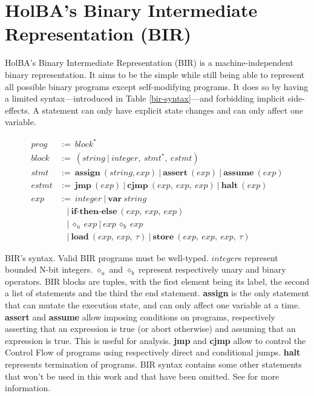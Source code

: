 \documentclass{kththesis}
\begin{document}
{\section{HolBA's Binary Intermediate Representation (BIR)} \label{bir-presentation}

HolBA's Binary Intermediate Representation (BIR) \cite{lindner_trabin:_2019} is a  machine-independent binary representation. It aims to be the simple while still being able to represent all possible binary programs except self-modifying programs. It does so by having a limited syntax---introduced in Table \ref{bir-syntax}---and forbidding implicit side-effects. A statement can only have explicit state changes and can only affect one variable.

\begin{table}[ht]
	\begin{align*}
		prog   & :=~block^{\ast}                                                             \\
		block  & :=~(string~|~integer,~stmt^{\ast},~estmt)                                   \\
		stmt   & :=~\textbf{assign}~(string, exp)~|~\textbf{assert}~(exp)~|~\textbf{assume}~(exp)  \\
        estmt  & :=~\textbf{jmp}~(exp)~|~\textbf{cjmp}~(exp,~exp,~exp)~|~\mathbf{halt}~(exp) \\
		exp    & :=~integer~|~\textbf{var}~string                                            \\
		       & ~~~~|~\textbf{if-then-else}~(exp,~exp,~exp)                                 \\
		       & ~~~~|~\diamond_{u}~exp~|~exp~\diamond_{b}~exp~                              \\
		       & ~~~~|~\textbf{load}~(exp,~exp,~\tau)~|~\textbf{store}~(exp,~exp,~exp,~\tau) 
	\end{align*}
  \caption{BIR's syntax. Valid BIR programs must be well-typed. $integer$s represent bounded N-bit integers. $\diamond_{u}$ and $\diamond_{b}$ represent respectively unary and binary operators. BIR blocks are tuples, with the first element being its label, the second a list of statements and the third the end statement.
  \textbf{assign} is the only statement that can mutate the execution state, and can only affect one variable at a time. \textbf{assert} and \textbf{assume} allow imposing conditions on programs, respectively asserting that an expression is true (or abort otherwise) and assuming that an expression is true. This is useful for analysis. \textbf{jmp} and \textbf{cjmp} allow to control the Control Flow of programs using respectively direct and conditional jumps. \textbf{halt} represents termination of programs.
  BIR syntax contains some other statements that won't be used in this work and that have been omitted. See \cite{lindner_trabin:_2019} for more information.}
	\label{bir-syntax}
\end{table}

}
\end{document}

